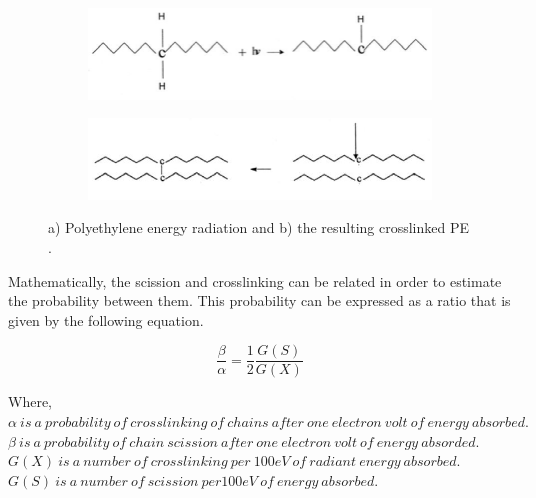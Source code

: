 \documentclass[12pt]{report}
\begin{document}
\begin{figure}[H]
\captionsetup[subfigure]{justification=raggedright}

\centering

\begin{subfigure}{.9\textwidth}
    \centering
    \includegraphics[width=\textwidth]{polyethylene_energy_radiation.jpg}
    \caption{}
\end{subfigure}
\begin{subfigure}{.9\textwidth}
    \centering
    \includegraphics[width=\textwidth]{resulting_crosslinked_pe.jpg}
    \caption{}
\end{subfigure}

\caption{a) Polyethylene energy radiation and b) the resulting crosslinked PE \cite{meola2005cross}.}
\label{ch3:figure:radiation}
\end{figure}

Mathematically, the scission and crosslinking can be related in order to estimate the probability between them. This probability can be expressed as a ratio that is given by the following equation.

\begin{equation}
    \frac{\beta}{\alpha}=\frac{1}{2}\frac{G(S)}{G(X)}
\end{equation}

\noindent Where, \\
$\alpha\ is\ a\ probability\ of\ crosslinking\ of\ chains\ after\ one\ electron\ volt\ of\ energy\ absorbed.$ \\
$\beta\ is\ a\ probability\ of\ chain\ scission\ after\ one\ electron\ volt\ of\ energy\ absorded.$ \\
$G(X)\ is\ a\ number\ of\ crosslinking\ per\ 100eV\ of\ radiant\ energy\ absorbed.$ \\
$G(S)\ is\ a\ number\ of\ scission\ per 100eV\ of\ energy\ absorbed.$ \\
\end{document}
